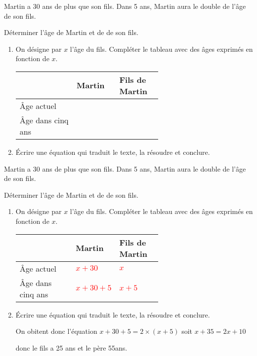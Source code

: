 \begin{exercice*}
    Martin a 30 ans de plus que son fils. Dans 5 ans, Martin aura le double de l'âge de son fils.

    Déterminer l'âge de Martin et de de son fils.
    \begin{enumerate}
        \item On désigne par $x$ l'âge du fils. Compléter le tableau avec des âges exprimés en fonction de $x$.
        
        \smallskip
        {\renewcommand{\arraystretch}{1.2}
        \begin{tabular}{|l|*{2}{>{\centering\arraybackslash}m{0.3\linewidth}|}}
            \cline{2-3}
            \multicolumn{1}{l|}{}&\cellcolor{LightGray}Martin&\cellcolor{LightGray}Fils de Martin\\\hline
            \cellcolor{LightGray}Âge actuel         &  &  \\\hline
            \cellcolor{LightGray}Âge dans cinq ans  &  &  \\\hline
        \end{tabular}
        }
        \smallskip
        \item Écrire une équation qui traduit le texte, la résoudre et conclure.
    \end{enumerate}
\end{exercice*}
\begin{corrige}
    Martin a 30 ans de plus que son fils. Dans 5 ans, Martin aura le double de l'âge de son fils.

    Déterminer l'âge de Martin et de de son fils.
    \begin{enumerate}
        \item On désigne par $x$ l'âge du fils. Compléter le tableau avec des âges exprimés en fonction de $x$.
        
        \smallskip
        {\renewcommand{\arraystretch}{1.2}
        \begin{tabular}{|l|*{2}{>{\centering\arraybackslash}m{0.3\linewidth}|}}
            \cline{2-3}
            \multicolumn{1}{l|}{}&\cellcolor{LightGray}Martin&\cellcolor{LightGray}Fils de Martin\\\hline
            \cellcolor{LightGray}Âge actuel         & \textcolor{red}{$x+30$}   & \textcolor{red}{$x$} \\\hline
            \cellcolor{LightGray}Âge dans cinq ans  & \textcolor{red}{$x+30+5$} & \textcolor{red}{$x+5$} \\\hline
        \end{tabular}
        }
        \smallskip
        \item Écrire une équation qui traduit le texte, la résoudre et conclure.
        
        {\color{red} On obitent donc l'équation $x+30+5=2\times(x+5)$ soit $x+35=2x+10$
        

        donc le fils a 25 ans et le père 55ans.
        }
    \end{enumerate}
\end{corrige}

